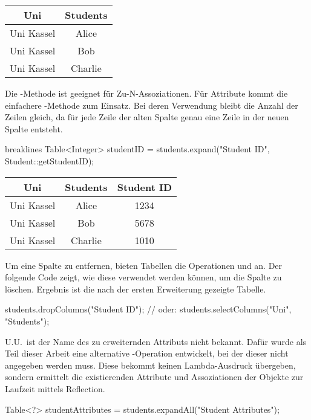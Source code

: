 \begin{tabular}{|c|c|}
    \hline
    \textbf{Uni} & \textbf{Students} \\
    \hline
    Uni Kassel & Alice   \\
    Uni Kassel & Bob     \\
    Uni Kassel & Charlie \\
    \hline
\end{tabular}

Die -Methode ist geeignet für Zu-N-Assoziationen.
Für Attribute kommt die einfachere -Methode zum Einsatz.
Bei deren Verwendung bleibt die Anzahl der Zeilen gleich,
da für jede Zeile der alten Spalte genau eine Zeile in der neuen Spalte entsteht.

\begin{jcodeblock*}{breaklines}
    Table<Integer> studentID = students.expand("Student ID", Student::getStudentID);
\end{jcodeblock*}

\begin{tabular}{|c|c|c|}
    \hline
    \textbf{Uni} & \textbf{Students} & \textbf{Student ID} \\
    \hline
    Uni Kassel & Alice   & 1234 \\
    Uni Kassel & Bob     & 5678 \\
    Uni Kassel & Charlie & 1010 \\
    \hline
\end{tabular}

Um eine Spalte zu entfernen, bieten Tabellen die Operationen  und  an.
Der folgende Code zeigt, wie diese verwendet werden können, um die Spalte  zu löschen.
Ergebnis ist die nach der ersten Erweiterung gezeigte Tabelle.

\begin{jcodeblock}
    students.dropColumns("Student ID");
    // oder:
    students.selectColumns("Uni", "Students");
\end{jcodeblock}

U.U.\ ist der Name des zu erweiternden Attributs nicht bekannt.
Dafür wurde als Teil dieser Arbeit eine alternative -Operation entwickelt,
bei der dieser nicht angegeben werden muss.
Diese bekommt keinen Lambda-Ausdruck übergeben, sondern ermittelt die existierenden Attribute und Assoziationen der Objekte zur Laufzeit mittels Reflection.

\begin{jcodeblock}
    Table<?> studentAttributes = students.expandAll("Student Attributes");
\end{jcodeblock}

